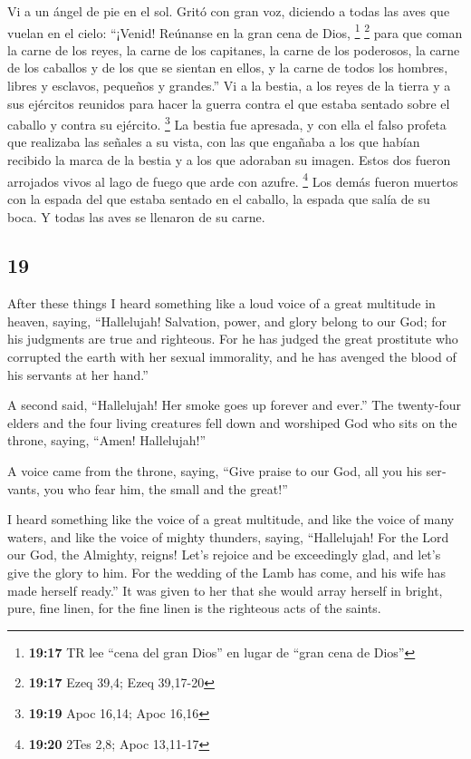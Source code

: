 \begin{paracol}{2}
 Vi a un ángel de pie en el sol. Gritó con gran voz,
diciendo a todas las aves que vuelan en el cielo: ``¡Venid! Reúnanse en
la gran cena de Dios, \footnote{\textbf{19:17} TR lee ``cena del gran
  Dios'' en lugar de ``gran cena de Dios''} \footnote{\textbf{19:17}
  Ezeq 39,4; Ezeq 39,17-20}  para que coman la carne de
los reyes, la carne de los capitanes, la carne de los poderosos, la
carne de los caballos y de los que se sientan en ellos, y la carne de
todos los hombres, libres y esclavos, pequeños y grandes.''
 Vi a la bestia, a los reyes de la tierra y a sus
ejércitos reunidos para hacer la guerra contra el que estaba sentado
sobre el caballo y contra su ejército. \footnote{\textbf{19:19} Apoc
  16,14; Apoc 16,16}  La bestia fue apresada, y con ella
el falso profeta que realizaba las señales a su vista, con las que
engañaba a los que habían recibido la marca de la bestia y a los que
adoraban su imagen. Estos dos fueron arrojados vivos al lago de fuego
que arde con azufre. \footnote{\textbf{19:20} 2Tes 2,8; Apoc 13,11-17}
 Los demás fueron muertos con la espada del que estaba
sentado en el caballo, la espada que salía de su boca. Y todas las aves
se llenaron de su carne.

\switchcolumn
\begin{otherlanguage}{english}

\hypertarget{section-37}{%
\section{19}\label{section-37}}

 After these things I heard something like a loud voice of
a great multitude in heaven, saying, ``Hallelujah! Salvation, power, and
glory belong to our God;  for his judgments are true and
righteous. For he has judged the great prostitute who corrupted the
earth with her sexual immorality, and he has avenged the blood of his
servants at her hand.''

 A second said, ``Hallelujah! Her smoke goes up forever
and ever.''  The twenty-four elders and the four living
creatures fell down and worshiped God who sits on the throne, saying,
``Amen! Hallelujah!''

 A voice came from the throne, saying, ``Give praise to
our God, all you his servants, you who fear him, the small and the
great!''

 I heard something like the voice of a great multitude,
and like the voice of many waters, and like the voice of mighty
thunders, saying, ``Hallelujah! For the Lord our God, the Almighty,
reigns!  Let's rejoice and be exceedingly glad, and let's
give the glory to him. For the wedding of the Lamb has come, and his
wife has made herself ready.''  It was given to her that
she would array herself in bright, pure, fine linen, for the fine linen
is the righteous acts of the saints.


\end{otherlanguage}
\end{paracol}
